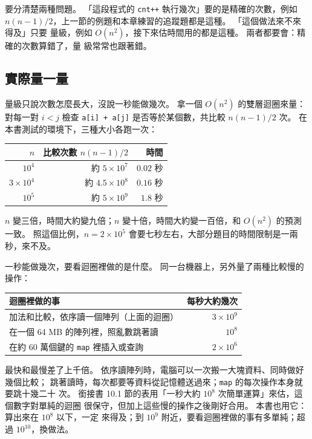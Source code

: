 要分清楚兩種問題。 「這段程式的 \texttt{cnt++} 執行幾次」要的是精確的次數，例如
$n(n - 1)/2$，上一節的例題和本章練習的追蹤題都是這種。 「這個做法來不來得及」只要
量級，例如 $O(n^2)$，接下來估時間用的都是這種。 兩者都要會：精確的次數算錯了，量
級常常也跟著錯。

\subsection{實際量一量}

量級只說次數怎麼長大，沒說一秒能做幾次。 拿一個 $O(n^2)$ 的雙層迴圈來量：
對每一對 $i < j$ 檢查 \texttt{a[i] + a[j]} 是否等於某個數，共比較 $n(n - 1)/2$ 次。
在本書測試的環境下，三種大小各跑一次：

\begin{center}
\begin{tabular}{rrr}
\toprule
$n$ & 比較次數 $n(n-1)/2$ & 時間 \\
\midrule
$10^4$ & 約 $5 \times 10^7$ & $0.02$ 秒 \\
$3 \times 10^4$ & 約 $4.5 \times 10^8$ & $0.16$ 秒 \\
$10^5$ & 約 $5 \times 10^9$ & $1.8$ 秒 \\
\bottomrule
\end{tabular}
\end{center}

$n$ 變三倍，時間大約變九倍；$n$ 變十倍，時間大約變一百倍，和 $O(n^2)$ 的預測一致。
照這個比例，$n = 2 \times 10^5$ 會要七秒左右，大部分題目的時間限制是一兩秒，來不及。

一秒能做幾次，要看迴圈裡做的是什麼。 同一台機器上，另外量了兩種比較慢的操作：

\begin{center}
\begin{tabular}{lr}
\toprule
迴圈裡做的事 & 每秒大約幾次 \\
\midrule
加法和比較，依序讀一個陣列（上面的迴圈） & $3 \times 10^9$ \\
在一個 64 MB 的陣列裡，照亂數跳著讀 & $10^8$ \\
在約 60 萬個鍵的 \texttt{map} 裡插入或查詢 & $2 \times 10^6$ \\
\bottomrule
\end{tabular}
\end{center}

最快和最慢差了上千倍。 依序讀陣列時，電腦可以一次搬一大塊資料、同時做好幾個比較；
跳著讀時，每次都要等資料從記憶體送過來；\texttt{map} 的每次操作本身就要跳十幾二十
次。 銜接書 10.1 節的表用「一秒大約 $10^8$ 次簡單運算」來估，這個數字對單純的迴圈
很保守，但加上這些慢的操作之後剛好合用。 本書也用它：算出來在 $10^8$ 以下，一定
來得及；到 $10^9$ 附近，要看迴圈裡做的事有多單純；超過 $10^{10}$，換做法。

